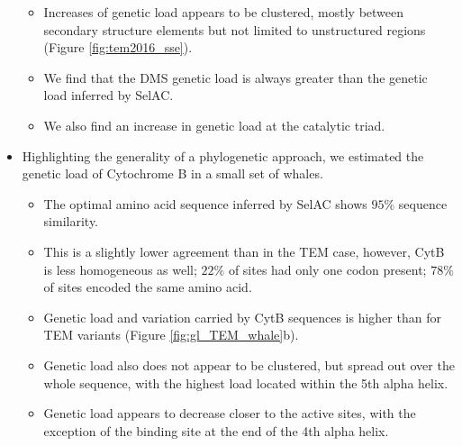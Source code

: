 \documentclass[12pt]{article}
\begin{document}
\begin{itemize}
\begin{itemize}
		\item Increases of genetic load appears to be clustered, mostly between secondary structure elements but not limited to unstructured regions (Figure \ref{fig:tem2016_sse}).
		\item We find that the DMS genetic load is always greater than the genetic load inferred by SelAC.
		\item We also find an increase in genetic load at the catalytic triad.
	\end{itemize}
	\item Highlighting the generality of a phylogenetic approach, we estimated the genetic load of Cytochrome B in a small set of whales.
	\begin{itemize}
		\item The optimal amino acid sequence inferred by SelAC shows $95\%$ sequence similarity.
		\item This is a slightly lower agreement than in the TEM case, however, CytB is less homogeneous as well; $22 \%$ of sites had only one codon present; $78 \%$ of sites encoded the same amino acid.
		\item Genetic load and variation carried by CytB sequences is higher than for TEM variants (Figure \ref{fig:gl_TEM_whale}b).
		\item Genetic load also does not appear to be clustered, but spread out over the whole sequence, with the highest load located within the 5th alpha helix.
		\item Genetic load appears to decrease closer to the active sites, with the exception of the binding site at the end of the 4th alpha helix.
	\end{itemize}
\end{itemize}
\end{document}
